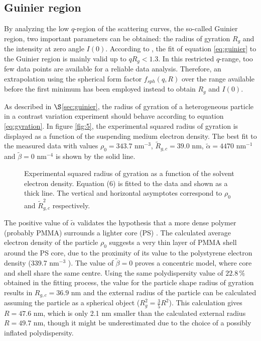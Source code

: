 \subsection{Guinier region}
By analyzing the low \(q \)-region of the scattering curves, the so-called Guinier region, two important parameters can be obtained: the radius of gyration \(R_g\) and the intensity at zero angle \(I(0)\). According to \cite{feigin_structure_1987}, the fit of equation \eqref{eq:guinier} to the Guinier region is mainly valid up to \( qR_g<1.3 \). In this restricted \(q\)-range, too few data points are available for a reliable data analysis. Therefore, an extrapolation using the spherical form factor \( f_{sph}(q,R) \) over the range available before the first minimum has been employed instead to obtain \(R_g\) and \(I(0)\).

As described in \(\S\)\ref{sec:guinier}, the radius of gyration of a heterogeneous particle in a contrast variation experiment should behave according to equation \eqref{eq:gyration}. In figure \ref{fig:5}, the experimental squared radius of gyration is displayed as a function of the suspending medium electron density. The best fit to the measured data with values \(\rho_0=343.7\) nm\(^{-3}\), \( \tilde R_{g,c}=39.0\) nm, \(\tilde \alpha=4470\) nm\(^{-1}\) and \(\tilde\beta=0\) nm\(^{-4}\) is shown by the solid line. 

\begin{figure}%
	\centering
		
		\caption{Experimental squared radius of gyration as a function of the solvent electron density. Equation (6) is fitted to the data and shown as a thick line. The vertical and horizontal asymptotes correspond to $\rho_0$ and $\tilde R^2_{g,c}$ respectively.}
		\label{fig:KiskerGuinierRadius}
\end{figure}

The positive value of \(\tilde\alpha\) validates the hypothesis that a more dense polymer (probably PMMA) surrounds a lighter core (PS) \cite{stuhrmann_small-angle_2008}. The calculated average electron density of the particle \(\rho_0\) suggests a very thin layer of PMMA shell around the PS core, due to the proximity of its value to the polystyrene electron density (339.7 nm\(^{-3}\) ). The value of \( \tilde\beta=0\) proves a concentric model, where core and shell share the same centre. Using the same polydispersity value of \(22.8\,\%\) obtained in the fitting process, the value for the particle shape radius of gyration results in \(R_{g,c}=36.9\) nm and the external radius of the particle can be calculated assuming the particle as a spherical object (\( R_g^2=\frac{3}{5}R^2 \)). This calculation gives \( R=47.6\) nm, which is only 2.1 nm smaller than the calculated external radius \(R=49.7\) nm, though it might be underestimated due to the choice of a possibly inflated polydispersity. 

